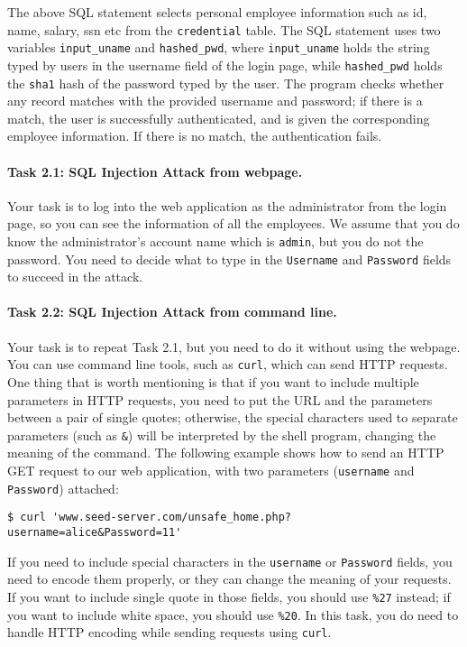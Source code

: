 The above SQL statement selects personal employee information such as id,
name, salary, ssn etc from the {\tt credential} table. The SQL statement
uses two variables \texttt{input\_uname} and \texttt{hashed\_pwd},
where \texttt{input\_uname} holds the string typed by 
users in the username field of the login page, while 
\texttt{hashed\_pwd} holds the \texttt{sha1} hash of the password typed by
the user. The program checks whether 
any record matches with the provided username and password; if there is a match,
the user is successfully authenticated, and is given the corresponding 
employee information. If there is no match, the authentication
fails. 



\paragraph{Task 2.1: SQL Injection Attack from webpage.}
Your task is to log into the web application as 
the administrator from the login page, so you can see the information of
all the employees. We assume that you do know the administrator's account name
which is {\tt admin}, but you do not the password. You need to decide
what to type in the \texttt{Username} and \texttt{Password} fields to
succeed in the attack.
	


\paragraph{Task 2.2: SQL Injection Attack from command line.}  
Your task is to repeat Task 2.1, but you need to do it without 
using the webpage. You can use command line tools, such as 
\texttt{curl}, which can send HTTP requests. 
One thing that is worth mentioning is that if you
want to include multiple parameters in HTTP requests, you need to put the
URL and the parameters between a pair of single quotes; otherwise, the 
special characters used to separate parameters (such as \texttt{\&}) will be
interpreted by the shell program, changing the meaning of the 
command. The following example shows how to send an HTTP GET request to our 
web application, with two parameters (\texttt{username} and 
\texttt{Password}) attached:

\begin{lstlisting}
$ curl 'www.seed-server.com/unsafe_home.php?username=alice&Password=11'
\end{lstlisting}

If you need to include special characters in the 
\texttt{username} or \texttt{Password} fields, you need to 
encode them properly, or they can change the meaning of your 
requests. If you want to include single quote in those fields,
you should use \texttt{\%27} instead; if you want to include
white space, you should use \texttt{\%20}. In this
task, you do need to handle HTTP encoding while sending
requests using \texttt{curl}.



